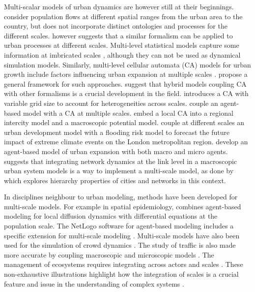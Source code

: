 \documentclass[ijgi,article,submit,moreauthors,pdftex]{Definitions/mdpi}
\begin{document}

Multi-scalar models of urban dynamics are however still at their beginnings. \cite{murcio2015urban} consider population flows at different spatial ranges from the urban area to the country, but does not incorporate distinct ontologies and processes for the different scales. \cite{batty2005agents} however suggests that a similar formalism can be applied to urban processes at different scales. Multi-level statistical models capture some information at imbricated scales \cite{shu2020modelling}, although they can not be used as dynamical simulation models. Similarly, multi-level cellular automata (CA) models for urban growth include factors influencing urban expansion at multiple scales \cite{xu2019directional}. \cite{cheng2003modelling} propose a general framework for such approaches. \cite{torrens2001cellular} suggest that hybrid models coupling CA with other formalisms is a crucial development in the field. \cite{white2006modeling} introduces a CA with variable grid size to account for heterogeneities across scales. \cite{zhu2020dynamic} couple an agent-based model with a CA at multiple scales. \cite{yu2018modeling} embed a local CA into a regional intercity model and a macroscopic potential model. \cite{ford2019multi} couple at different scales an urban development model with a flooding risk model to forecast the future impact of extreme climate events on the London metropolitan region. \cite{xu2020urban} develop an agent-based model of urban expansion with both macro and micro agents. \cite{raimbault:halshs-02013006} suggests that integrating network dynamics at the link level in a macroscopic urban system models is a way to implement a multi-scale model, as done by \cite{raimbault2020hierarchy} which explores hierarchy properties of cities and networks in this context.

In disciplines neighbour to urban modeling, methods have been developed for multi-scale models. For example in spatial epidemiology, \cite{banos2015importance} combines agent-based modeling for local diffusion dynamics with differential equations at the population scale. The NetLogo software for agent-based modeling includes a specific extension for multi-scale modeling \cite{hjorth2020levelspace}. Multi-scale models have also been used for the simulation of crowd dynamics \cite{crociani2016multi}. The study of traffic is also made more accurate by coupling macroscopic and microscopic models \cite{boulet2020coupling}. The management of ecosystems  requires integrating across actors and scales \cite{belem2013organizational}. These non-exhaustive illustrations highlight how the integration of scales is a crucial feature and issue in the understanding of complex systems \cite{chavalarias2009french}.
\end{document}
